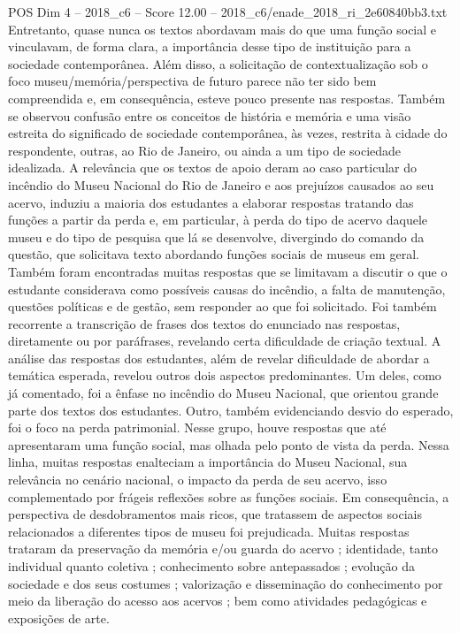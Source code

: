 \begin{textsample}{POS Dim 4 – 2018\_c6 – Score 12.00 – 2018\_c6/enade\_2018\_ri\_2e60840bb3.txt}
Entretanto, quase nunca os textos abordavam mais do que uma função social e vinculavam, de forma clara, a importância desse tipo de instituição para a sociedade contemporânea.
Além disso, a solicitação de contextualização sob o foco museu/memória/perspectiva de futuro parece não ter sido bem compreendida e, em consequência, esteve pouco presente nas respostas.
Também se observou confusão entre os conceitos de história e memória e uma visão estreita do significado de sociedade contemporânea, às vezes, restrita à cidade do respondente, outras, ao Rio de Janeiro, ou ainda a um tipo de sociedade idealizada.
A relevância que os textos de apoio deram ao caso particular do incêndio do Museu Nacional do Rio de Janeiro e aos prejuízos causados ao seu acervo, induziu a maioria dos estudantes a elaborar respostas tratando das funções a partir da perda e, em particular, à perda do tipo de acervo daquele museu e do tipo de pesquisa que lá se desenvolve, divergindo do comando da questão, que solicitava texto abordando funções sociais de museus em geral.
Também foram encontradas muitas respostas que se limitavam a discutir o que o estudante considerava como possíveis causas do incêndio, a falta de manutenção, questões políticas e de gestão, sem responder ao que foi solicitado.
Foi também recorrente a transcrição de frases dos textos do enunciado nas respostas, diretamente ou por paráfrases, revelando certa dificuldade de criação textual.
A análise das respostas dos estudantes, além de revelar dificuldade de abordar a temática esperada, revelou outros dois aspectos predominantes.
Um deles, como já comentado, foi a ênfase no incêndio do Museu Nacional, que orientou grande parte dos textos dos estudantes.
Outro, também evidenciando desvio do esperado, foi o foco na perda patrimonial.
Nesse grupo, houve respostas que até apresentaram uma função social, mas olhada pelo ponto de vista da perda.
Nessa linha, muitas respostas enalteciam a importância do Museu Nacional, sua relevância no cenário nacional, o impacto da perda de seu acervo, isso complementado por frágeis reflexões sobre as funções sociais.
Em consequência, a perspectiva de desdobramentos mais ricos, que tratassem de aspectos sociais relacionados a diferentes tipos de museu foi prejudicada.
Muitas respostas trataram da preservação da memória e/ou guarda do acervo ; identidade, tanto individual quanto coletiva ; conhecimento sobre antepassados ; evolução da sociedade e dos seus costumes ; valorização e disseminação do conhecimento por meio da liberação do acesso aos acervos ; bem como atividades pedagógicas e exposições de arte.

\end{textsample}
